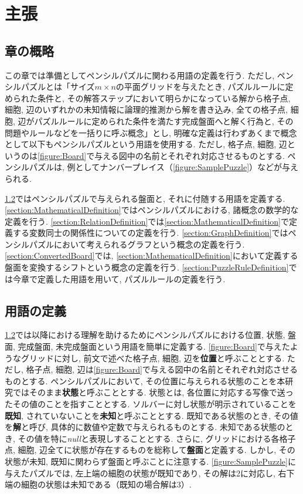 \chapter{主張}\label{chapter:Prepare}
\section{章の概略}\label{section:Outline}
この章では準備としてペンシルパズルに関わる用語の定義を行う. ただし, ペンシルパズルとは「サイズ$m\times n$の平面グリッドを与えたとき, パズルルールに定められた条件と, その解答ステップにおいて明らかになっている解から格子点, 細胞, 辺のいずれかの未知情報に論理的推測から解を書き込み, 全ての格子点, 細胞, 辺がパズルルールに定められた条件を満たす完成盤面へと解く行為と, その問題やルールなどを一括りに呼ぶ概念」とし, 明確な定義は行わずあくまで概念として以下もペンシルパズルという用語を使用する. ただし, 格子点, 細胞, 辺というのは\cref{figure:Board}で与える図中の名前とそれぞれ対応させるものとする.
ペンシルパズルは, 例としてナンバープレイス（\cref{figure:SamplePuzzle}）などが与えられる.

\cref{section:WordDefinition}ではペンシルパズルで与えられる盤面と, それに付随する用語を定義する.
\cref{section:MathematicalDefinition}ではペンシルパズルにおける, 諸概念の数学的な定義を行う.
\cref{section:RelationDefinition}では\cref{section:MathematicalDefinition}で定義する変数同士の関係性についての定義を行う.
\cref{section:GraphDefinition}ではペンシルパズルにおいて考えられるグラフという概念の定義を行う.
\cref{section:ConvertedBoard}では, \cref{section:MathematicalDefinition}において定義する盤面を変換するシフトという概念の定義を行う.
\cref{section:PuzzleRuleDefinition}では今章で定義した用語を用いて, パズルルールの定義を行う.

\section{用語の定義}\label{section:WordDefinition}
\cref{section:WordDefinition}では以降における理解を助けるためにペンシルパズルにおける位置, 状態, 盤面, 完成盤面, 未完成盤面という用語を簡単に定義する. \cref{figure:Board}で与えたようなグリッドに対し, 前文で述べた格子点, 細胞, 辺を\textbf{位置}と呼ぶこととする. ただし, 格子点, 細胞, 辺は\cref{figure:Board}で与える図中の名前とそれぞれ対応させるものとする. ペンシルパズルにおいて, その位置に与えられる状態のことを本研究ではそのまま\textbf{状態}と呼ぶこととする. 状態とは, 各位置に対応する写像で送ったその値のことを指すこととする. ソルバーに対し状態が明示されていることを\textbf{既知}, されていないことを\textbf{未知}と呼ぶこととする. 既知である状態のとき, その値を\textbf{解}と呼び, 具体的に数値や定数で与えられるものとする. 未知である状態のとき, その値を特に\textit{null}と表現しすることとする. さらに, グリッドにおける各格子点, 細胞, 辺全てに状態が存在するものを総称して\textbf{盤面}と定義する. しかし, その状態が未知, 既知に関わらず盤面と呼ぶことに注意する. \cref{figure:SamplePuzzle}に与えたパズルでは, 左上端の細胞の状態が既知であり, その解は2に対応し, 右下端の細胞の状態は未知である（既知の場合解は3）.

